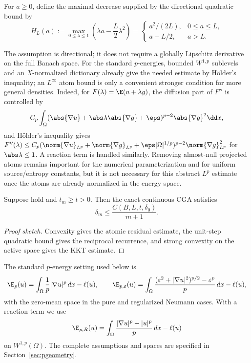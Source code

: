 For $a\geq0$, define the maximal decrease supplied by the directional quadratic
bound by
\[
 H_L(a):=\max_{0\leq\lambda\leq1}
       \left(\lambda a-\frac L2\lambda^2\right)
 =\begin{cases}a^2/(2L),&0\leq a\leq L,\\
                 a-L/2,&a>L.
   \end{cases}
\]

The assumption is directional; it does not require a globally Lipschitz derivative on the full Banach
space. For the standard \(p\)-energies, bounded \(W^{1,p}\) sublevels and an \(X\)-normalized dictionary
already give the needed estimate by H\"older's inequality; an \(L^\infty\) atom bound is only a
convenient stronger condition for more general densities. Indeed, for
\(F(\lambda)=\E(u+\lambda g)\), the diffusion part of \(F''\) is controlled by
\[
 C_p\int_\Omega(\abs{\nabla u}+\abs\lambda\abs{\nabla g}+\eps)^{p-2}
 \abs{\nabla g}^2\dd x,
\]
and H\"older's inequality gives
\(F''(\lambda)\leq C_p(\norm{\nabla u}_{L^p}+\norm{\nabla g}_{L^p}+\eps|\Omega|^{1/p})^{p-2}
\norm{\nabla g}_{L^p}^2\) for \(\abs\lambda\leq1\). A reaction term is handled similarly. Removing
almost-null projected atoms remains important for the numerical parameterization and for uniform
source/entropy constants, but it is not necessary for this abstract \(L^p\) estimate once the atoms are
already normalized in the energy space.

\begin{theorem}
\label{thm:generic}
Suppose  hold and \(t_m\geq t>0\). Then the exact continuous CGA
satisfies
\begin{equation}
  \delta_m\leq \frac{C(B,L,t,\delta_0)}{m+1}.
\label{eq:generic-rate}
\end{equation}
\end{theorem}

\begin{proof}[Proof sketch]
Convexity gives the atomic residual estimate, the unit-step quadratic bound gives the reciprocal recurrence, and strong convexity on the active space gives the KKT estimate.
\end{proof}

The standard $p$-energy setting used below is
\[
 \E_p(u)=\int_\Omega \frac1p|\nabla u|^p\,dx-\ell(u),\qquad
 \E_{p,\varepsilon}(u)=\int_\Omega
 \frac{(\varepsilon^2+|\nabla u|^2)^{p/2}-\varepsilon^p}{p}\,dx-\ell(u),
\]
with the zero-mean space in the pure and regularized Neumann cases. With a reaction
term we use
\[
 \E_{p,R}(u)=\int_\Omega\frac{|\nabla u|^p+|u|^p}{p}\,dx-\ell(u)
\]
on $W^{1,p}(\Omega)$. The complete assumptions and spaces are specified in
Section~\ref{sec:pgeometry}.

